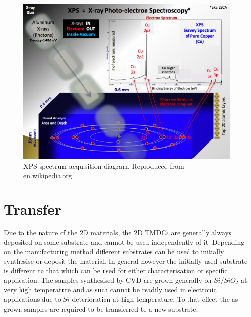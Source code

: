 \begin{figure}[!h]
	\begin{center}
		\includegraphics[scale=0.3]{Methodology/XPSSetup.png}
		\caption{XPS spectrum acquisition diagram. Reproduced from en.wikipedia.org}
		\label{fig:MethodologyXPSSetup}
	\end{center}
\end{figure}

\section{Transfer}

Due to the nature of the 2D materials, the 2D TMDCs are generally always deposited on some substrate and cannot be used independently of it. Depending on the manufacturing method different substrates can be used to initially synthesise or deposit the material. In general however the initially used substrate is different to that which can be used for either characterisation or specific application. The samples synthesised by CVD are grown generally on $Si/SiO_2$ at very high temperature and as such cannot be readily used in electronic applications due to $Si$ deterioration at high temperature. To that effect the as grown samples are required to be transferred to a new substrate. 

